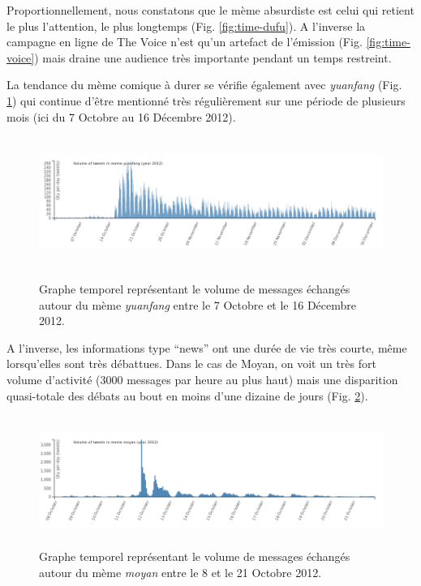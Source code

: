 Proportionnellement, nous constatons que le m\`eme absurdiste est celui
qui retient le plus l{\textquoteright}attention, le plus longtemps
(Fig. \ref{fig:time-dufu}). A l{\textquoteright}inverse la campagne en ligne de The
Voice n{\textquoteright}est qu{\textquoteright}un artefact de
l{\textquoteright}\'emission (Fig. \ref{fig:time-voice}) mais draine une audience tr\`es
importante pendant un temps restreint.


La tendance du m\`eme comique \`a durer se v\'erifie \'egalement avec
\textit{yuanfang} (Fig. \ref{fig:time-yuanfang}) qui continue d{\textquoteright}\^etre mentionn\'e
tr\`es r\'eguli\`erement sur une p\'eriode de plusieurs mois (ici du 7
Octobre au 16 D\'ecembre 2012).

\begin{figure}[ht]
    \centering
    
  \includegraphics[width=6.0087in,height=1.6697in]{figures/chap4/chapitre4-img5.png}
  \label{fig:time-yuanfang}
  \caption{
   Graphe temporel repr\'esentant le volume de messages \'echang\'es  autour du m\`eme \textit{yuanfang} entre le 7 Octobre et le 16 D\'ecembre 2012.
  }
\end{figure}


A l{\textquoteright}inverse, les informations type {\textquotedblleft}news{\textquotedblright} ont une dur\'ee de vie tr\`es courte, m\^eme lorsqu{\textquoteright}elles sont tr\`es d\'ebattues. Dans le cas de Moyan, on voit un tr\`es fort volume d{\textquoteright}activit\'e (3000 messages par heure au plus haut) mais une disparition quasi-totale des d\'ebats au bout en moins d{\textquoteright}une dizaine de jours (Fig. \ref{fig:time-moyan}).

\begin{figure}
    \centering
    \includegraphics[width=6.0087in,height=1.6697in]{figures/chap4/chapitre4-img6.png}
    \caption{
      Graphe temporel repr\'esentant le volume de messages \'echang\'es autour du m\`eme \textit{moyan} entre le 8 et le 21 Octobre 2012.
    }
    \label{fig:time-moyan}
\end{figure}

